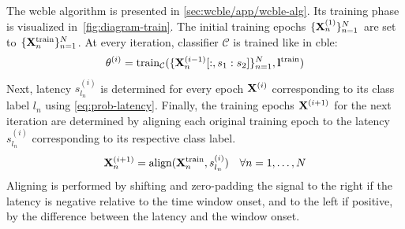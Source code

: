 The \ac{wcble} algorithm is presented in \cref{sec:wcble/app/wcble-alg}.
Its training phase is visualized in~\cref{fig:diagram-train}.
The initial training epochs $\{\mathbf{X}_n^{(1)}\}_{n=1}^N$ are set to $\{\mathbf{X}_n^\mathrm{train}\}_{n=1}^N$.
At every iteration, classifier $\mathcal{C}$ is trained like in \ac{cble}:
\begin{equation}
  \theta^{(i)} =
  \mathrm{train}_\mathcal{C}(\{\mathbf{X}^{(i-1)}_n[:,s_1:s_2]\}_{n=1}^N,\mathbf{l}^\mathrm{train})
\end{equation}
Next, latency $s_{l_n}^{(i)}$ is determined for every epoch $\mathbf{X}^{(i)}$ corresponding
to its class label $l_n$ using \cref{eq:prob-latency}.
Finally, the training epochs $\mathbf{X}^{(i+1)}$ for the next iteration are determined by aligning
each original training epoch to the latency $s_{l_n}^{(i)}$ corresponding to its respective class
label.
\begin{equation}
  \mathbf{X}^{(i+1)}_n = \mathrm{align}(\mathbf{X}_n^\mathrm{train}, s_{l_n}^{(i)}) \quad \forall n=1,\ldots,N
\end{equation}
Aligning is performed by shifting and zero-padding the signal to the right if
the latency is negative relative to the time window onset, and to the left if
positive, by the difference between the latency and the window onset.
